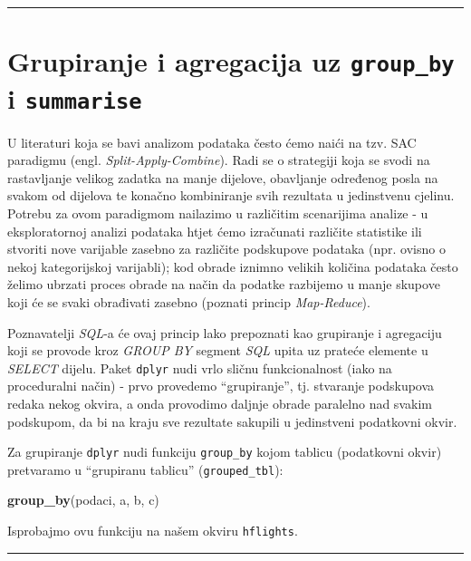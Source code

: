 \documentclass[]{book}
\newenvironment{Shaded}{\begin{snugshade}}{\end{snugshade}}
\newcommand{\KeywordTok}[1]{\textcolor[rgb]{0.13,0.29,0.53}{\textbf{#1}}}
\newcommand{\NormalTok}[1]{#1}
\theoremstyle{definition}
\theoremstyle{definition}
\theoremstyle{definition}
\theoremstyle{remark}
\begin{document}
\begin{center}\rule{0.5\linewidth}{\linethickness}\end{center}

\section{\texorpdfstring{Grupiranje i agregacija uz \texttt{group\_by} i
\texttt{summarise}}{Grupiranje i agregacija uz group\_by i summarise}}\label{grupiranje-i-agregacija-uz-group_by-i-summarise}

U literaturi koja se bavi analizom podataka često ćemo naići na tzv. SAC
paradigmu (engl. \emph{Split-Apply-Combine}). Radi se o strategiji koja
se svodi na rastavljanje velikog zadatka na manje dijelove, obavljanje
određenog posla na svakom od dijelova te konačno kombiniranje svih
rezultata u jedinstvenu cjelinu. Potrebu za ovom paradigmom nailazimo u
različitim scenarijima analize - u eksploratornoj analizi podataka htjet
ćemo izračunati različite statistike ili stvoriti nove varijable zasebno
za različite podskupove podataka (npr. ovisno o nekoj kategorijskoj
varijabli); kod obrade iznimno velikih količina podataka često želimo
ubrzati proces obrade na način da podatke razbijemo u manje skupove koji
će se svaki obrađivati zasebno (poznati princip \emph{Map-Reduce}).

Poznavatelji \emph{SQL}-a će ovaj princip lako prepoznati kao grupiranje
i agregaciju koji se provode kroz \emph{GROUP BY} segment \emph{SQL}
upita uz prateće elemente u \emph{SELECT} dijelu. Paket \texttt{dplyr}
nudi vrlo sličnu funkcionalnost (iako na proceduralni način) - prvo
provedemo ``grupiranje'', tj. stvaranje podskupova redaka nekog okvira,
a onda provodimo daljnje obrade paralelno nad svakim podskupom, da bi na
kraju sve rezultate sakupili u jedinstveni podatkovni okvir.

Za grupiranje \texttt{dplyr} nudi funkciju \texttt{group\_by} kojom
tablicu (podatkovni okvir) pretvaramo u ``grupiranu tablicu''
(\texttt{grouped\_tbl}):

\begin{Shaded}
\begin{Highlighting}[]
\KeywordTok{group_by}\NormalTok{(podaci, a, b, c)}
\end{Highlighting}
\end{Shaded}

Isprobajmo ovu funkciju na našem okviru \texttt{hflights}.

\begin{center}\rule{0.5\linewidth}{\linethickness}\end{center}
\end{document}
